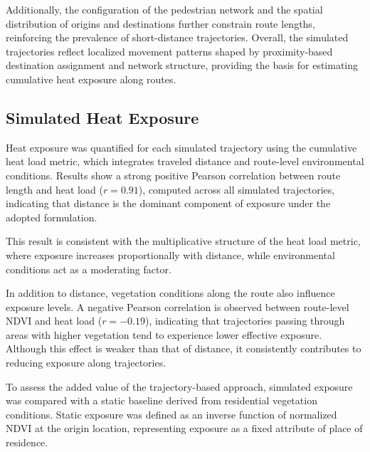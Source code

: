 \documentclass{wscpaperproc}
\theoremstyle{wsc}
\begin{document}
Additionally, the configuration of the pedestrian network and the spatial distribution of origins and destinations further constrain route lengths, reinforcing the prevalence of short-distance trajectories.  Overall, the simulated trajectories reflect localized movement patterns shaped by proximity-based destination assignment and network structure, providing the basis for estimating cumulative heat exposure along routes.

\subsection{Simulated Heat Exposure}


Heat exposure was quantified for each simulated trajectory using the cumulative heat load metric, which integrates traveled distance and route-level environmental conditions. Results show a strong positive Pearson correlation between route length and heat load ($r = 0.91$), computed across all simulated trajectories, indicating that distance is the dominant component of exposure under the adopted formulation.

This result is consistent with the multiplicative structure of the heat load metric, where exposure increases proportionally with distance, while environmental conditions act as a moderating factor.

In addition to distance, vegetation conditions along the route also influence exposure levels. A negative Pearson correlation is observed between route-level NDVI and heat load ($r = -0.19$), indicating that trajectories passing through areas with higher vegetation tend to experience lower effective exposure. Although this effect is weaker than that of distance, it consistently contributes to reducing exposure along trajectories.

To assess the added value of the trajectory-based approach, simulated exposure was compared with a static baseline derived from residential vegetation conditions. Static exposure was defined as an inverse function of normalized NDVI at the origin location, representing exposure as a fixed attribute of place of residence.
\end{document}
